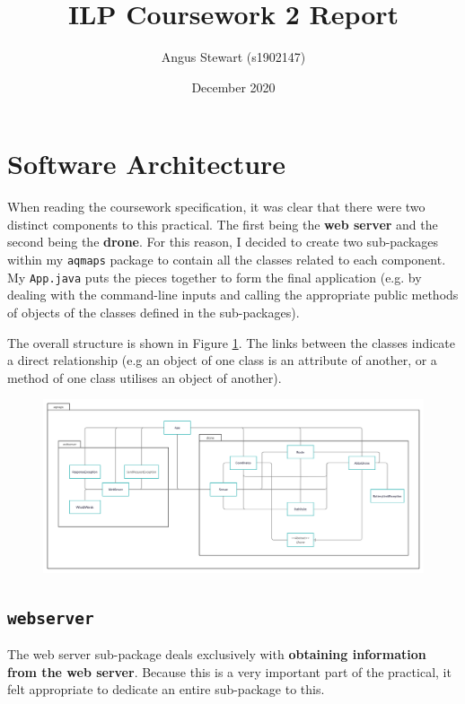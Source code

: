 \documentclass[11pt]{article}
\title{ILP Coursework 2 Report}
\author{Angus Stewart (s1902147)}
\date{December 2020}
\begin{document}
\maketitle
\thispagestyle{empty}

\newpage

\tableofcontents

\newpage
{}

\section{Software Architecture}
When reading the coursework specification, it was clear that there were two distinct components to this practical. The first being the \textbf{web server} and the second being the \textbf{drone}. For this reason, I decided to create two sub-packages within my \texttt{aqmaps} package to contain all the classes related to each component. My \texttt{App.java} puts the pieces together to form the final application (e.g. by dealing with the command-line inputs and calling the appropriate public methods of objects of the classes defined in the sub-packages).

The overall structure is shown in Figure \ref{fig:uml}. The links between the classes indicate a direct relationship (e.g an object of one class is an attribute of another, or a method of one class utilises an object of another).
\begin{figure}[h]
    \centering
    \includegraphics[width=\textwidth]{uml-class-diagram}
    \label{fig:uml}
\end{figure}

\subsection{\texttt{webserver}}
The web server sub-package deals exclusively with \textbf{obtaining information from the web server}. Because this is a very important part of the practical, it felt appropriate to dedicate an entire sub-package to this.
\end{document}
